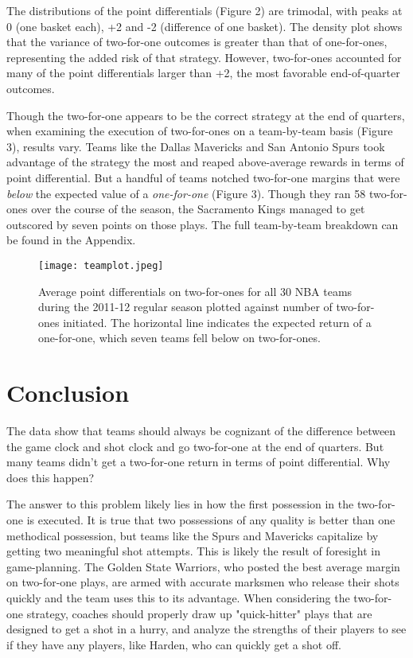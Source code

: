 \documentclass{article}
\begin{document}
The distributions of the point differentials (Figure 2) are trimodal, with peaks at 0 (one basket each), +2 and -2 (difference of one basket). The density plot shows that the variance of two-for-one outcomes is greater than that of one-for-ones, representing the added risk of that strategy. However, two-for-ones accounted for many of the point differentials larger than +2, the most favorable end-of-quarter outcomes.

Though the two-for-one appears to be the correct strategy at the end of quarters, when examining the execution of two-for-ones on a team-by-team basis (Figure 3), results vary. Teams like the Dallas Mavericks and San Antonio Spurs took advantage of the strategy the most and reaped above-average rewards in terms of point differential. But a handful of teams notched two-for-one margins that were \emph{below} the expected value of a \emph{one-for-one} (Figure 3). Though they ran 58 two-for-ones over the course of the season, the Sacramento Kings managed to get outscored by seven points on those plays. The full team-by-team breakdown can be found in the Appendix.

\begin{figure}
\centering
\texttt{[image: teamplot.jpeg]}
\caption{Average point differentials on two-for-ones for all 30 NBA teams during the 2011-12 regular season plotted against number of two-for-ones initiated. The horizontal line indicates the expected return of a one-for-one, which seven teams fell below on two-for-ones.}
\end{figure}

\section{Conclusion}
 
The data show that teams should always be cognizant of the difference between the game clock and shot clock and go two-for-one at the end of quarters. But many teams didn't get a two-for-one return in terms of point differential. Why does this happen?

The answer to this problem likely lies in how the first possession in the two-for-one is executed. It is true that two possessions of any quality is better than one methodical possession, but teams like the Spurs and Mavericks capitalize by getting two meaningful shot attempts. This is likely the result of foresight in game-planning. The Golden State Warriors, who posted the best average margin on two-for-one plays, are armed with accurate marksmen who release their shots quickly and the team uses this to its advantage. When considering the two-for-one strategy, coaches should properly draw up "quick-hitter" plays that are designed to get a shot in a hurry, and analyze the strengths of their players to see if they have any players, like Harden, who can quickly get a shot off.
\end{document}
